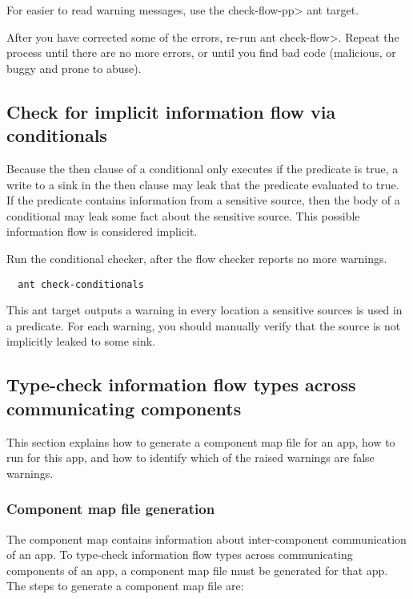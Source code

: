 For easier to read warning messages, use the \<check-flow-pp> ant target.

After you have corrected some of the errors, re-run \<ant check-flow>.
Repeat the process until there are no more errors, or until you find bad
code (malicious, or buggy and prone to abuse).

\subsection{Check for implicit information flow via conditionals}
Because the then clause of a conditional only executes if the predicate is true, a write
 to a sink in the then clause may leak that the predicate evaluated to true.  If the predicate
  contains information from a sensitive source, then the body of a conditional may leak some 
  fact about the sensitive source.  This possible information flow is considered implicit.

Run the conditional checker, after the flow checker reports no more warnings.

\begin{Verbatim}
  ant check-conditionals 
\end{Verbatim}

This ant target outputs a warning in every location a sensitive sources is used in a 
predicate.  For each warning, you should manually verify that the source is not
implicitly leaked to some sink.

\subsection{Type-check information flow types across communicating components}
This section explains how to generate a component map file for an app, how to
run \theIntentChecker{} for this app, and how to identify which of the raised
warnings are false warnings.

\subsubsection{Component map file generation\label{component-map-generation}}
The component map contains information about inter-component communication of
an app. To type-check information flow types across communicating components of
an app, a component map file must be generated for that app. The steps to
generate a component map file are:

